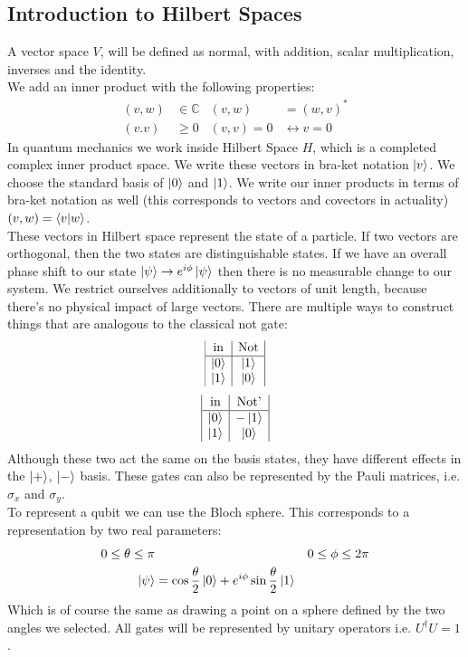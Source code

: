 \subsection{Introduction to Hilbert Spaces}
A vector space $V$, will be defined as normal, with addition, scalar multiplication, inverses and the identity.\\
We add an inner product with the following properties:
\begin{align*}
	(v,w) &\in \mathbb{C} &
	(v,w) &= (w,v)^* \\
	(v.v) &\geq 0 &
	(v,v) = 0 &\leftrightarrow v = 0
\end{align*}
In quantum mechanics we work inside Hilbert Space $H$, which is a completed complex inner product space. We write these vectors in bra-ket notation $\ket{v}$. We choose the standard basis of $\ket{0}$ and $\ket{1}$. We write our inner products in terms of bra-ket notation as well (this corresponds to vectors and covectors in actuality) $(v,w) = \bra{v}\ket{w}$. \\
These vectors in Hilbert space represent the state of a particle. If two vectors are orthogonal, then the two states are distinguishable states. If we have an overall phase shift to our state $\ket{\psi} \to e^{i\phi}\ket{\psi}$ then there is no measurable change to our system. We restrict ourselves additionally to vectors of unit length, because there's no physical impact of large vectors. There are multiple ways to construct things that are analogous to the classical not gate:
\begin{displaymath}
\begin{array}{|c | c|}
	\text{in} & \text{Not} \\
	\hline
	\ket{0} & \ket{1} \\
	\ket{1} & \ket{0}
\end{array}
\end{displaymath}
\begin{displaymath}
\begin{array}{|c | c|}
	\text{in} & \text{Not'} \\
	\hline
	\ket{0} & -\ket{1} \\
	\ket{1} & \ket{0}
\end{array}
\end{displaymath}
Although these two act the same on the basis states, they have different effects in the $\ket{+}$, $\ket{-}$ basis. These gates can also be represented by the Pauli matrices, i.e. $\sigma_x$ and $\sigma_y$.\\
To represent a qubit we can use the Bloch sphere. This corresponds to a representation by two real parameters:
\begin{align*}
	0 \leq \theta \leq \pi && 0 \leq \phi \leq 2\pi \\
	\ket{\psi} &= \cos \frac{\theta}{2} \ket{0} + e^{i\phi} \sin\frac{\theta}{2} \ket{1}
\end{align*}
Which is of course the same as drawing a point on a sphere defined by the two angles we selected. All gates will be represented by unitary operators i.e. $U^\dagger U = 1$.
